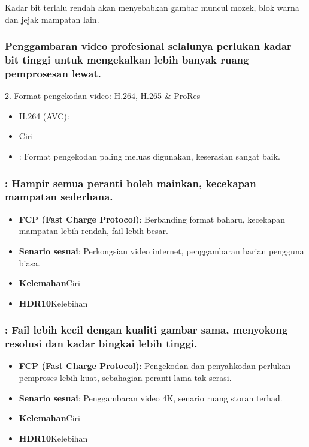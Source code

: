 Kadar bit terlalu rendah akan menyebabkan gambar muncul mozek, blok warna dan jejak mampatan lain.

\subsubsection*{Penggambaran video profesional selalunya perlukan kadar bit tinggi untuk mengekalkan lebih banyak ruang pemprosesan lewat.}

2. Format pengekodan video: H.264, H.265 \& ProRes

\begin{itemize}
  \item H.264 (AVC):
  \item Ciri
  \item : Format pengekodan paling meluas digunakan, keserasian sangat baik.
\end{itemize}


\subsubsection*{: Hampir semua peranti boleh mainkan, kecekapan mampatan sederhana.}

\begin{itemize}
  \item \textbf{FCP (Fast Charge Protocol)}: Berbanding format baharu, kecekapan mampatan lebih rendah, fail lebih besar.
  \item \textbf{Senario sesuai}: Perkongsian video internet, penggambaran harian pengguna biasa.
  \item \textbf{Kelemahan}Ciri
  \item \textbf{HDR10}Kelebihan
\end{itemize}

\subsubsection*{: Fail lebih kecil dengan kualiti gambar sama, menyokong resolusi dan kadar bingkai lebih tinggi.}

\begin{itemize}
  \item \textbf{FCP (Fast Charge Protocol)}: Pengekodan dan penyahkodan perlukan pemproses lebih kuat, sebahagian peranti lama tak serasi.
  \item \textbf{Senario sesuai}: Penggambaran video 4K, senario ruang storan terhad.
  \item \textbf{Kelemahan}Ciri
  \item \textbf{HDR10}Kelebihan
\end{itemize}


